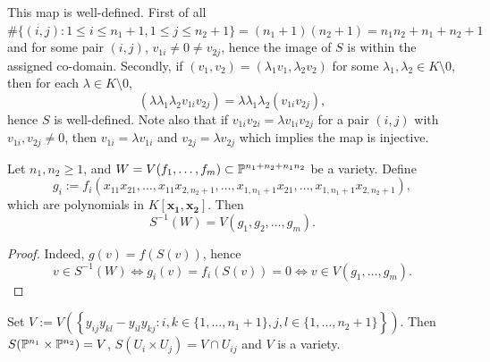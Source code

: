         \begin{remark}
            This map is well-defined. First of all $\#\{(i,j):1\leq i\leq n_1+1, 1\leq j\leq n_2+1\} = (n_1+1)(n_2+1)= n_1n_2+n_1+n_2+1$ and for some pair $(i,j)$, $v_{1i}\neq0 \neq v_{2j}$, hence the image of $S$ is within the assigned co-domain. Secondly, if $(v_1,v_2)=(\lambda_1v_1,\lambda_2v_2)$ for some $\lambda_1,\lambda_2\in K\setminus 0$, then for each $\lambda \in K\setminus 0$, 
            $$(\lambda \lambda_1\lambda_2 v_{1i}v_{2j})= \lambda\lambda_1\lambda_2 (v_{1i}v_{2j}),$$
            hence $S$ is well-defined.
            Note also that if $v_{1i}v_{2i}=\lambda v_{1i}v_{2j}$ for a pair $(i,j)$ with $v_{1i},v_{2j}\neq 0$, then $v_{1i} = \lambda v_{1i}$ and $v_{2j} = \lambda v_{2j}$ which implies the map is injective.   
        \end{remark}
        \begin{lemma}\label{SegreEmbeddingIsContinuous}
            Let $n_1,n_2\geq 1$, and $W=V(f_1,\dots,f_m)\subset \mathbb{P}^{n_1+n_2+n_1n_2}$ be a variety. Define $$g_i := f_i(x_{11}x_{21},\dots,x_{11}x_{2,n_2+1},\dots, x_{1,n_1+1}x_{21},\dots,x_{1,n_1+1}x_{2,n_2+1}),$$
            which are polynomials in $K[\mathbf{x_1},\mathbf{x_2}]$. Then $$S^{-1}(W)= V(g_1,g_2,\dots,g_m).$$ 
        \end{lemma}
        \begin{proof}
            Indeed, $g(v)=f(S(v))$, hence 
            $$v\in S^{-1}(W) \iff  g_i(v) = f_i(S(v))= 0 \iff v\in V(g_1,\dots,g_m).$$
        \end{proof}
        \begin{lemma}\label{SegreEmbeddingHasImageWhichIsVariety}
            Set $V:=V(\left\{y_{ij}y_{kl} - y_{il}y_{kj} : i,k\in\{1,\dots, n_1+1\}, j,l\in \{1,\dots,n_2+1\}\right\})$. Then $S(\mathbb{P}^{n_1}\times \mathbb{P}^{n_2}) = V$, $S(U_i\times U_j)= V\cap U_{ij}$ and $V$ is a variety.  
        \end{lemma}
